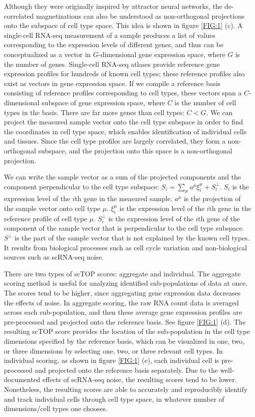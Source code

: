 \documentclass[aps,superscriptaddress, notitlepage,longbibliography]{revtex4-1}
\begin{document}
Although they were originally inspired by attractor neural networks, the de-correlated magnetizations can also be understood as non-orthogonal projections onto the subspace of cell type space. This idea is shown in figure \ref{FIG:1} (c). A single-cell RNA-seq measurement of a sample produces a list of values corresponding to the expression levels of different genes, and thus can be conceptualized as a vector in $G$-dimensional gene expression space, where $G$ is the number of genes. Single-cell RNA-seq atlases provide reference gene expression profiles for hundreds of known cell types; these reference profiles also exist as vectors in gene expression space. If we compile a reference basis consisting of reference profiles corresponding to cell types, these vectors span a $C$-dimensional subspace of gene expression space, where $C$ is the number of cell types in the basis. There are far more genes than cell types: $C < G$. We can project the measured sample vector onto the cell type subspace in order to find the coordinates in cell type space, which enables identification of individual cells and tissues. Since the cell type profiles are largely correlated, they form a non-orthogonal subspace, and the projection onto this space is a non-orthogonal projection.

We can write the sample vector as a sum of the projected components and the component perpendicular to the cell type subspace: $S_i = \sum_\mu a^{\mu} \xi^{\mu}_i + S^{\perp}_i$. $S_i$ is the expression level of the $i$th gene in the measured sample. $a^{\mu}$ is the projection of the sample vector onto cell type $\mu$. $\xi^{\mu}_i$ is the expression level of the $i$th gene in the reference profile of cell type $\mu$. $S^{\perp}_i$ is the expression level of the $i$th gene of the component of the sample vector that is perpendicular to the cell type subspace. $S^{\perp}$ is the part of the sample vector that is not explained by the known cell types. It results from biological processes such as cell cycle variation and non-biological sources such as scRNA-seq noise. 

There are two types of scTOP scores: aggregate and individual. The aggregate scoring method is useful for analyzing identified sub-populations of data at once. The scores tend to be higher, since aggregating gene expression data decreases the effects of noise. In aggregate scoring, the raw RNA count data is averaged across each sub-population, and then these average gene expression profiles are pre-processed and projected onto the reference basis. See figure \ref{FIG:1} (d). The resulting scTOP score provides the location of the sub-population in the cell type dimensions specified by the reference basis, which can be visualized in one, two, or three dimensions by selecting one, two, or three relevant cell types. In individual scoring, as shown in figure \ref{FIG:1} (e), each individual cell is pre-processed and projected onto the reference basis separately. Due to the well-documented effects of scRNA-seq noise, the resulting scores tend to be lower. Nonetheless, the resulting scores are able to accurately and reproducibly identify and track individual cells through cell type space, in whatever number of dimensions/cell types one chooses.
\end{document}

